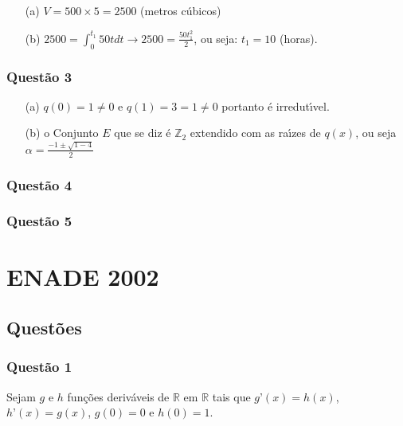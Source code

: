 \documentclass{report}
\begin{document}
\begin{enumerate}

\item[(a)] $V=500\times 5=2500$ (metros c\'ubicos)

\item[(b)] $2500=\displaystyle \int_0^{t_1} 50 t dt \longrightarrow 2500=\frac{50t_1^2}{2}$, ou seja: $t_1=10$ (horas).

\end{enumerate}

\subsection{\color{red} Quest\~ao 3}

\begin{enumerate}

\item[(a)] $q(0)=1\neq 0$ e $q(1)=3=1\neq 0$ portanto \'e irredut\'\i vel.

\item[(b)] o Conjunto $E$ que se diz \'e $\mathbb Z_2$ extendido com as ra\'\i zes de $q(x)$, ou seja $\alpha=\displaystyle\frac{-1\pm \sqrt{1-4}}{2}$

\end{enumerate}

\subsection{\color{red} Quest\~ao 4}

\subsection{\color{red} Quest\~ao 5}

\chapter{ENADE 2002}

\section{\color{blue} Quest\~oes}

\subsection{\color{blue} Quest\~ao 1}

Sejam $g$ e $h$ fun\c c\~oes deriv\'aveis de $\mathbb R$ em $\mathbb R$ tais que $g’(x)=h(x)$, $h’(x)=g(x)$, $g(0)=0$ e $h(0)=1$.
\end{document}
